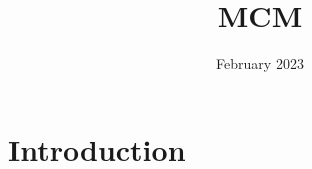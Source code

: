 \documentclass{article}
\title{MCM}
\date{February 2023}
\begin{document}
\maketitle

\section{Introduction}
\end{document}
